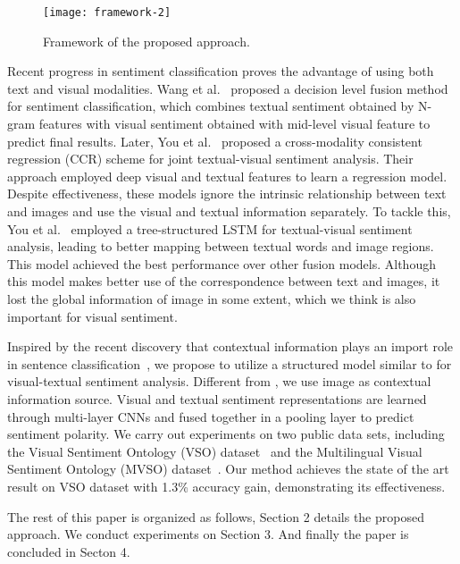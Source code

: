 \documentclass{article}
\begin{document}
\begin{figure*}[tbp]
	\centering
	\texttt{[image: framework-2]}
	\caption{Framework of the proposed approach.}\label{fig:sys}
	\vspace{-0.3cm}
\end{figure*}

Recent progress in sentiment classification proves the advantage of using both text and visual modalities. Wang et al.~\cite{wang2014microblog} proposed a decision level fusion method for sentiment classification, which combines textual sentiment obtained by N-gram features with visual sentiment obtained with mid-level visual feature to predict final results. Later, You et al.~\cite{you2016cross} proposed a cross-modality consistent regression (\mbox{CCR}) scheme for joint textual-visual sentiment analysis. Their approach employed deep visual and textual features to learn a regression model. Despite effectiveness, these models ignore the intrinsic relationship between text and images and use the visual and textual information separately. To tackle this, You et al.~\cite{you2016robust} employed a tree-structured LSTM for textual-visual sentiment analysis, leading to better mapping between textual words and image regions. This model achieved the best performance over other fusion models. Although this model makes better use of the correspondence between text and images, it lost the global information of image in some extent, which we think is also important for visual sentiment.

Inspired by the recent discovery that contextual information plays an import role in sentence classification~\cite{ren2016context}, we propose to utilize a structured model similar to \cite{ren2016context} for visual-textual sentiment analysis. Different from \cite{ren2016context}, we use image as contextual information source. Visual and textual sentiment representations are learned through multi-layer CNNs and fused together in a pooling layer to predict sentiment polarity. We carry out experiments on two public data sets, including the Visual Sentiment Ontology (VSO) dataset~\cite{borth2013large} and the Multilingual Visual Sentiment Ontology (MVSO) dataset~\cite{jou2015visual}. Our method achieves the state of the art result on VSO dataset with 1.3\% accuracy gain, demonstrating its effectiveness.

The rest of this paper is organized as follows, Section 2 details the proposed approach. We conduct experiments on Section 3. And finally the paper is concluded in Secton 4.
\end{document}
